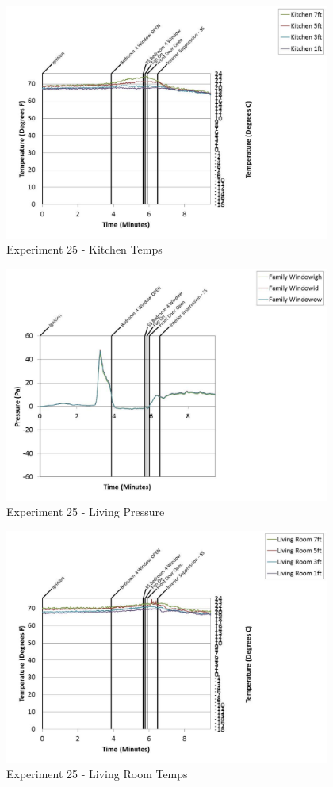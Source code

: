 \documentclass{article}
\begin{document}
\begin{appendices}
	\clearpage

	\begin{figure}[h!]
		\centering
		\includegraphics[height=3.05in]{0_Images/Results_Charts/Exp_25_Charts/KitchenTemps.pdf}
		\caption{Experiment 25 - Kitchen Temps}
	\end{figure}
 

	\begin{figure}[h!]
		\centering
		\includegraphics[height=3.05in]{0_Images/Results_Charts/Exp_25_Charts/LivingPressure.pdf}
		\caption{Experiment 25 - Living Pressure}
	\end{figure}
 
	\clearpage

	\begin{figure}[h!]
		\centering
		\includegraphics[height=3.05in]{0_Images/Results_Charts/Exp_25_Charts/LivingRoomTemps.pdf}
		\caption{Experiment 25 - Living Room Temps}
	\end{figure}
 


\end{appendices}
\end{document}
